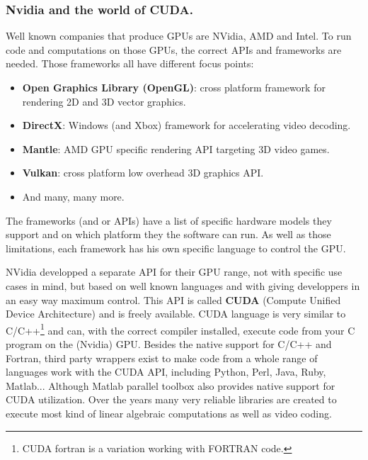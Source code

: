 \subsubsection{Nvidia and the world of CUDA.}
Well known companies that produce GPUs are NVidia, AMD and Intel. 
To run code and computations on those GPUs, the correct APIs and frameworks are needed.
Those frameworks all have different focus points:
\begin{itemize}
	\item \textbf{Open Graphics Library (OpenGL)}: cross platform framework for rendering 2D and 3D vector graphics.
	\item \textbf{DirectX}: Windows (and Xbox) framework for accelerating video decoding.
	\item \textbf{Mantle}: AMD GPU specific rendering API targeting 3D video games.
	\item \textbf{Vulkan}: cross platform low overhead 3D graphics API.
	\item And many, many more.
\end{itemize}
The frameworks (and or APIs) have a list of specific hardware models they support and on which platform they the software can run.
As well as those limitations, each framework has his own specific language to control the GPU.
\par 
NVidia developped a separate API for their GPU range, not with specific use cases in mind, but based on well known languages and with giving developpers in an easy way maximum control.
This API is called \textbf{CUDA} (Compute Unified Device Architecture) and is freely available.
CUDA language is very similar to C/C++\footnote{CUDA fortran is a variation working with FORTRAN code.} and can, with the correct compiler installed, execute code from your C program on the (Nvidia) GPU.
Besides the native support for C/C++ and Fortran, third party wrappers exist to make code from a whole range of languages work with the CUDA API, including Python, Perl, Java, Ruby, Matlab...
Although Matlab parallel toolbox also provides native support for CUDA utilization.
Over the years many very reliable libraries are created to execute most kind of linear algebraic computations as well as video coding.
